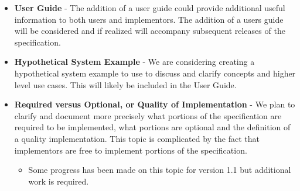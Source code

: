\begin{itemize}[noitemsep,nolistsep]
\item{\textbf{User Guide} - The addition of a user guide could provide additional useful information to both users and implementors. The addition of a users guide will be considered and if realized will accompany subsequent releases of the specification.
}
\item{\textbf{Hypothetical System Example} - We are considering creating a hypothetical system example to use to discuss and clarify concepts and higher level use cases. This will likely be included in the User Guide.
}
\item{\textbf{Required versus Optional, or Quality of Implementation} - We plan to clarify and document more precisely what portions of the specification are required to be implemented, what portions are optional and the definition of a quality implementation. This topic is complicated by the fact that implementors are free to implement portions of the specification. 
}
    \begin{itemize}
        \item{Some progress has been made on this topic for version 1.1 but additional work is required.}
    \end{itemize}


\end{itemize}
